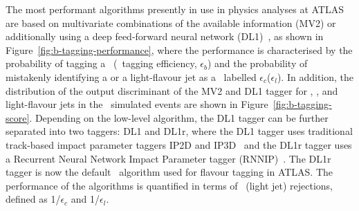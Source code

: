 \documentclass[letterpaper,12pt]{article}
\begin{document}
The most performant algorithms presently in use in physics 
analyses at ATLAS are based on multivariate combinations 
of the available information (MV2) or additionally using a
deep feed-forward neural network (DL1)~\cite{tagging,ATL-PHYS-PUB-2017-013}, 
as shown in Figure~\ref{fig:b-tagging-performance}, where the performance
is characterised by the probability of 
tagging a \bjet\ (\bjet\ tagging efficiency, 
$\epsilon_b$) and the probability of mistakenly identifying 
a \cjet or a light-flavour jet as a \bjet\, 
labelled $\epsilon_c$($\epsilon_l$). 
In addition, the distribution of the output discriminant
of the MV2 and DL1 tagger for \bjet, \cjet, and light-flavour jets
in the \ttbar\ simulated events are shown in Figure~\ref{fig:b-tagging-score}.
Depending on the low-level algorithm, 
the DL1 tagger can be further separated into two taggers: DL1 and DL1r,
 where the DL1 tagger uses traditional track-based impact parameter 
 taggers IP2D and IP3D~\cite{ATL-PHYS-PUB-2016-012} 
 and the DL1r tagger uses a Recurrent Neural Network Impact Parameter tagger 
 (RNNIP)~\cite{ATL-PHYS-PUB-2017-013}. The DL1r tagger is now the 
 default \btagging\ algorithm used for flavour tagging in ATLAS.
 The performance of the algorithms is quantified 
in terms of \cjet\ (light jet) rejections, defined as 
1/$\epsilon_c$ and 1/$\epsilon_l$. 
\end{document}
